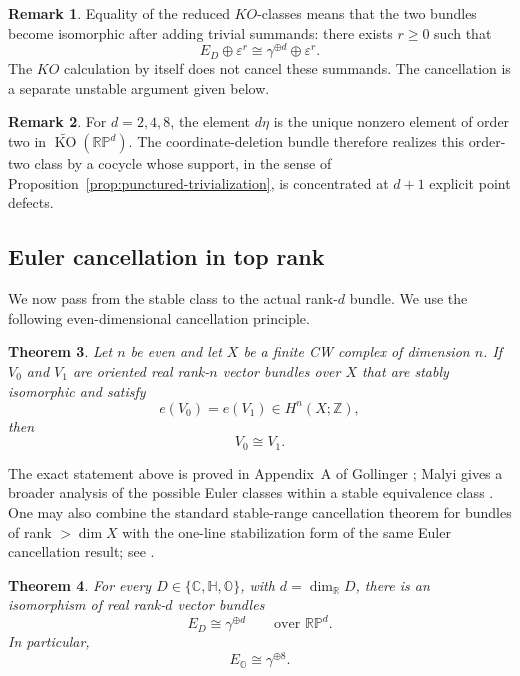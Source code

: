 \documentclass[12pt]{article}
\theoremstyle{plain}
\newtheorem{theorem}{Theorem}[section]
\theoremstyle{definition}
\newtheorem{remark}[theorem]{Remark}
\newcommand{\R}{\mathbb R}
\newcommand{\C}{\mathbb C}
\newcommand{\Hh}{\mathbb H}
\newcommand{\Oct}{\mathbb O}
\newcommand{\RP}{\mathbb{RP}}
\newcommand{\KO}{\operatorname{KO}}
\begin{document}
\begin{remark}
	Equality of the reduced $KO$-classes means that the two bundles become
	isomorphic after adding trivial summands: there exists $r\ge0$ such that
	\[
	E_D\oplus\varepsilon^r
	\cong
	\gamma^{\oplus d}\oplus\varepsilon^r.
	\]
	The $KO$ calculation by itself does not cancel these summands. The
	cancellation is a separate unstable argument given below.
\end{remark}

\begin{remark}
	For $d=2,4,8$, the element $d\eta$ is the unique nonzero element of
	order two in $\widetilde{\KO}(\RP^d)$. The coordinate-deletion bundle
	therefore realizes this order-two class by a cocycle whose support, in
	the sense of Proposition~\ref{prop:punctured-trivialization}, is
	concentrated at $d+1$ explicit point defects.
\end{remark}

\subsection{Euler cancellation in top rank}
\label{sec:cancellation}

We now pass from the stable class to the actual rank-$d$ bundle. We use
the following even-dimensional cancellation principle.

\begin{theorem}
	\label{thm:euler-cancellation}
	Let $n$ be even and let $X$ be a finite CW complex of dimension $n$.
	If $V_0$ and $V_1$ are oriented real rank-$n$ vector bundles over $X$
	that are stably isomorphic and satisfy
	\[
	e(V_0)=e(V_1)\in H^n(X;\mathbb Z),
	\]
	then
	\[
	V_0\cong V_1.
	\]
\end{theorem}

The exact statement above is proved in Appendix~A of Gollinger
\cite{Gollinger}; Malyi gives a broader analysis of the possible Euler
classes within a stable equivalence class \cite{Malyi}. One may also
combine the standard stable-range cancellation theorem for bundles of
rank $>\dim X$ with the one-line stabilization form of the same Euler
cancellation result; see \cite{Husemoller,Gollinger}.

\begin{theorem}
	\label{thm:actual-identification}
	For every $D\in\{\C,\Hh,\Oct\}$, with $d=\dim_\R D$, there is an
	isomorphism of real rank-$d$ vector bundles
	\[
	E_D\cong\gamma^{\oplus d}
	\qquad\text{over }\RP^d.
	\]
	In particular,
	\[
	E_{\Oct}\cong\gamma^{\oplus8}.
	\]
\end{theorem}
\end{document}
